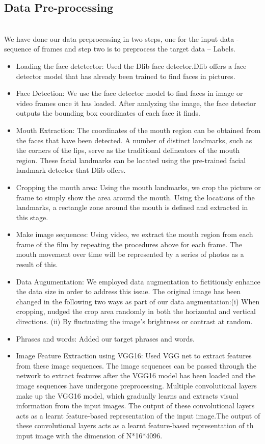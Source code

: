 \documentclass[conference]{IEEEtran}
\begin{document}
\subsection{Data Pre-processing}
\\  We have done our data preprocessing in two steps, one for the input data -sequence of frames and step two is to preprocess the target data – Labels. 
\begin{itemize}
\item Loading the face detetector: Used the Dlib face detector.Dlib offers a face detector model that has already been trained to find faces in pictures. 
\item Face Detection: We use the face detector model to find faces in image or video frames once it has loaded. After analyzing the image, the face detector outputs the bounding box coordinates of each face it finds.
\item Mouth Extraction: The coordinates of the mouth region can be obtained from the faces that have been detected. A number of distinct landmarks, such as the corners of the lips, serve as the traditional delineators of the mouth region. These facial landmarks can be located using the pre-trained facial landmark detector that Dlib offers.
\item Cropping the mouth area: Using the mouth landmarks, we crop the picture or frame to simply show the area around the mouth. Using the locations of the landmarks, a rectangle zone around the mouth is defined and extracted in this stage.
\item Make image sequences: Using video, we extract the mouth region from each frame of the film by repeating the procedures above for each frame. The mouth movement over time will be represented by a series of photos as a result of this.
\item Data Augumentation: We employed data augmentation to fictitiously enhance the data size in order to address this issue. The original image has been changed in the following two ways as part of our data augmentation:(i) When cropping, nudged the crop area randomly in both the horizontal and vertical directions. (ii) By fluctuating the image's brightness or contrast at random.
\item Phrases and words: Added our target phrases and words.
\item Image Feature Extraction using VGG16: Used VGG net to extract features from these image sequences. The image sequences can be passed through the network to extract features after the VGG16 model has been loaded and the image sequences have undergone preprocessing. Multiple convolutional layers make up the VGG16 model, which gradually learns and extracts visual information from the input images. The output of these convolutional layers acts as a learnt feature-based representation of the input image.The output of these convolutional layers acts as a learnt feature-based representation of th input image with the dimension of N*16*4096.

\end{itemize}
\end{document}
